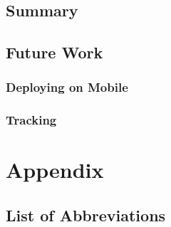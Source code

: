 \documentclass[10pt]{book}
\begin{document}
\section{Summary}

\section{Future Work}

\subsection{Deploying on Mobile}

\subsection{Tracking}

\chapter{Appendix}

\section{List of Abbreviations}
\end{document}
